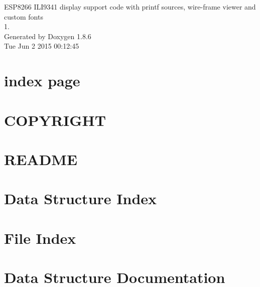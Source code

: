 \documentclass[twoside]{book}
\newcommand{\clearemptydoublepage}{%
  \newpage{\pagestyle{empty}\cleardoublepage}%
}
\begin{document}
\hypersetup{pageanchor=false}
\begin{titlepage}
\vspace*{7cm}
\begin{center}%
{\Large E\-S\-P8266 I\-L\-I9341 display support code with printf sources, wire-\/frame viewer and custom fonts \\[1ex]\large 1. }\\
\vspace*{1cm}
{\large Generated by Doxygen 1.8.6}\\
\vspace*{0.5cm}
{\small Tue Jun 2 2015 00:12:45}\\
\end{center}
\end{titlepage}
\clearemptydoublepage
\tableofcontents
\clearemptydoublepage
{}
\hypersetup{pageanchor=true}

\chapter{index page}
\label{index}\hypertarget{index}{}
\chapter{C\-O\-P\-Y\-R\-I\-G\-H\-T}
\label{md_COPYRIGHT}
\hypertarget{md_COPYRIGHT}{}

\chapter{R\-E\-A\-D\-M\-E}
\label{md_README}
\hypertarget{md_README}{}

\chapter{Data Structure Index}

\chapter{File Index}

\chapter{Data Structure Documentation}












\end{document}
